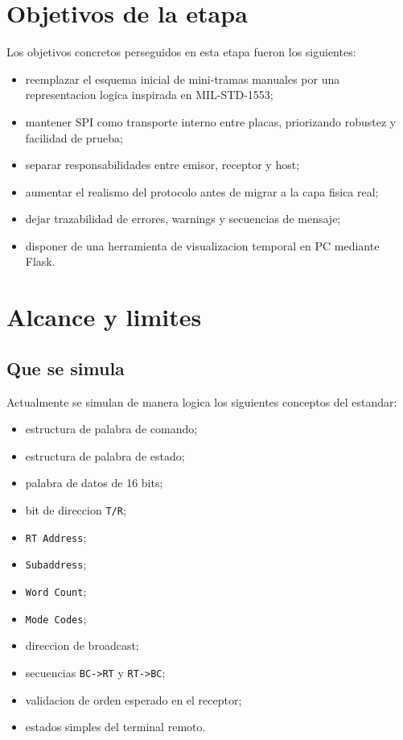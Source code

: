 \documentclass[12pt,a4paper]{article}
\begin{document}
\section{Objetivos de la etapa}

Los objetivos concretos perseguidos en esta etapa fueron los siguientes:

\begin{itemize}
    \item reemplazar el esquema inicial de mini-tramas manuales por una representacion logica
    inspirada en MIL-STD-1553;
    \item mantener SPI como transporte interno entre placas, priorizando robustez y facilidad de
    prueba;
    \item separar responsabilidades entre emisor, receptor y host;
    \item aumentar el realismo del protocolo antes de migrar a la capa fisica real;
    \item dejar trazabilidad de errores, warnings y secuencias de mensaje;
    \item disponer de una herramienta de visualizacion temporal en PC mediante Flask.
\end{itemize}

\section{Alcance y limites}

\subsection{Que se simula}

Actualmente se simulan de manera logica los siguientes conceptos del estandar:

\begin{itemize}
    \item estructura de palabra de comando;
    \item estructura de palabra de estado;
    \item palabra de datos de 16 bits;
    \item bit de direccion \texttt{T/R};
    \item \texttt{RT Address};
    \item \texttt{Subaddress};
    \item \texttt{Word Count};
    \item \texttt{Mode Codes};
    \item direccion de broadcast;
    \item secuencias \texttt{BC->RT} y \texttt{RT->BC};
    \item validacion de orden esperado en el receptor;
    \item estados simples del terminal remoto.
\end{itemize}
\end{document}
